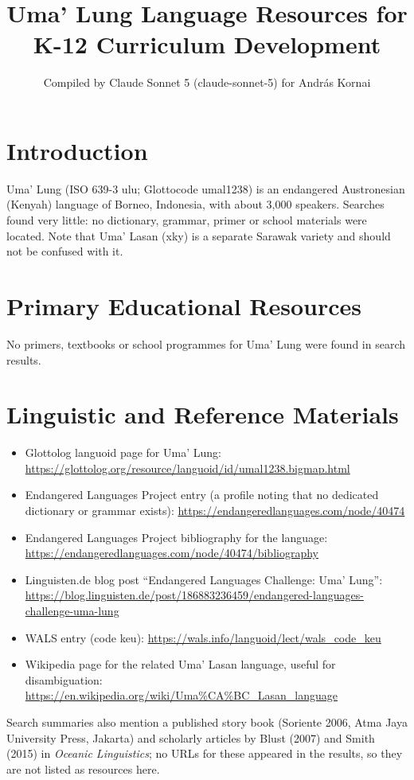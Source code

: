 \documentclass[12pt]{article}
\title{Uma' Lung Language Resources for K-12 Curriculum Development}
\author{Compiled by Claude Sonnet 5 (claude-sonnet-5) for Andr\'as Kornai}
\date{}
\begin{document}
\maketitle

\section{Introduction}
Uma' Lung (ISO 639-3 ulu; Glottocode umal1238) is an endangered Austronesian (Kenyah) language of Borneo, Indonesia, with about 3,000 speakers. Searches found very little: no dictionary, grammar, primer or school materials were located. Note that Uma' Lasan (xky) is a separate Sarawak variety and should not be confused with it.

\section{Primary Educational Resources}
No primers, textbooks or school programmes for Uma' Lung were found in search results.

\section{Linguistic and Reference Materials}
\begin{itemize}
\item Glottolog languoid page for Uma' Lung: \url{https://glottolog.org/resource/languoid/id/umal1238.bigmap.html}
\item Endangered Languages Project entry (a profile noting that no dedicated dictionary or grammar exists): \url{https://endangeredlanguages.com/node/40474}
\item Endangered Languages Project bibliography for the language: \url{https://endangeredlanguages.com/node/40474/bibliography}
\item Linguisten.de blog post ``Endangered Languages Challenge: Uma' Lung'': \url{https://blog.linguisten.de/post/186883236459/endangered-languages-challenge-uma-lung}
\item WALS entry (code keu): \url{https://wals.info/languoid/lect/wals_code_keu}
\item Wikipedia page for the related Uma' Lasan language, useful for disambiguation: \url{https://en.wikipedia.org/wiki/Uma%CA%BC_Lasan_language}
\end{itemize}
Search summaries also mention a published story book (Soriente 2006, Atma Jaya University Press, Jakarta) and scholarly articles by Blust (2007) and Smith (2015) in \emph{Oceanic Linguistics}; no URLs for these appeared in the results, so they are not listed as resources here.
\end{document}
